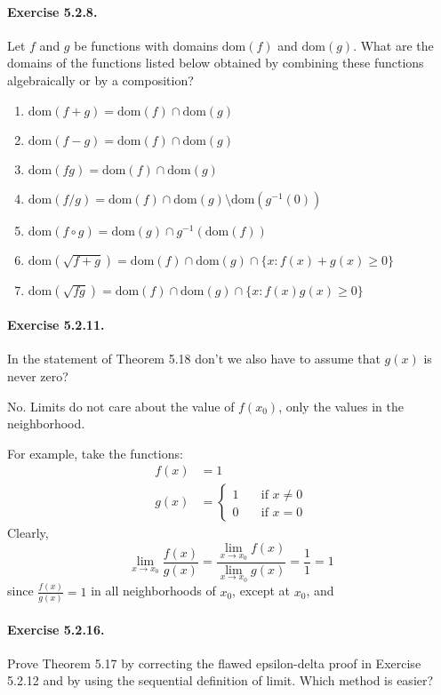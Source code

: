 \documentclass[11pt]{article}
\newcommand{\set}[1]{\{#1\}}
\def \limitToXZero {\lim_{x \to x_0}}
\begin{document}
\newcommand{\dom}[1]{\text{dom}(#1)}
\newcommand{\inv}[1]{#1^{-1}}
\paragraph{Exercise 5.2.8.} Let $f$ and $g$ be functions with domains $\dom{f}$ and $\dom{g}$.
What are the domains of the functions listed below obtained by combining these functions algebraically or by a composition?
\begin{enumerate}[label=(\alph*)] %
  \item $ \dom{f + g} = \dom{f} \cap \dom{g} $

  \item $ \dom{f - g} = \dom{f} \cap \dom{g} $

  \item $ \dom{fg} = \dom{f} \cap \dom{g} $

  \item $ \dom{f/g} = \dom{f} \cap \dom{g} \setminus \dom{\inv{g}(0)}$
  
  \item $ \dom{f \circ g} = \dom{g} \cap \inv{g}(\dom{f})$
  
  \item $ \dom{\sqrt{f + g}} = \dom{f} \cap \dom{g} \cap \set{x : f(x) + g(x) \ge 0} $
  
  \item $ \dom{\sqrt{fg}} = \dom{f} \cap \dom{g} \cap \set{x : f(x)g(x) \ge 0} $
  
\end{enumerate}

\paragraph{Exercise 5.2.11.} In the statement of Theorem 5.18 don't we also have to assume that $g(x)$ is never zero?

No. Limits do not care about the value of $ f(x_0) $, only the values in the neighborhood.

For example, take the functions:
\begin{align*}
	f(x) &= 1 \\
	g(x) &=
		\begin{cases}
		1 & \quad \text{if } x \ne 0 \\
		0 & \quad \text{if } x = 0
		\end{cases}
\end{align*}
Clearly, 
	$$\limitToXZero \frac{f(x)}{g(x)} = \frac{\limitToXZero f(x)}{\limitToXZero g(x)} = \frac{1}{1} = 1 $$
since $ \frac{f(x)}{g(x)} =1 $ in all neighborhoods of $ x_0 $, except at $x_0$, and 

\paragraph{Exercise 5.2.16.} Prove Theorem 5.17 by correcting the flawed epsilon-delta proof in Exercise 5.2.12 and by using the sequential definition of limit.
Which method is easier?

\end{document}
